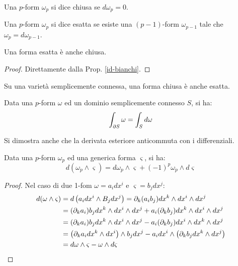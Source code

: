 \begin{definition}
	Una $ p $-form $ \omega_p $ si dice chiusa se $ d\omega_p = 0 $.
\end{definition}

\begin{definition}
	Una $ p $-form $ \omega_p $ si dice esatta se esiste una $ (p-1) $-form $ \omega_{p-1} $ tale che $ \omega_p = d\omega_{p-1} $.
\end{definition}

\begin{proposition}
	Una forma esatta è anche chiusa.
\end{proposition}
\begin{proof}
	Direttamente dalla Prop. \ref{id-bianchi}.
\end{proof}

\begin{lemma}[di Poincaré]
	Su una varietà semplicemente connessa, una forma chiusa è anche esatta.
\end{lemma}

\begin{theorem}[di Stokes]\label{th-stokes}
	Data una $ p $-form $ \omega $ ed un dominio semplicemente connesso $ S $, si ha:
	\begin{equation}
		\int_{\partial S} \omega = \int_S d\omega
		\label{eq:3.11}
	\end{equation}
\end{theorem}

Si dimostra anche che la derivata esteriore anticommuta con i differenziali.

\begin{proposition}
	Data una $ p $-form $ \omega_p $ ed una generica forma $ \varsigma $, si ha:
	\begin{equation}
		d(\omega_p \wedge \varsigma) = d\omega_p \wedge \varsigma + (-1)^p \omega_p \wedge d\varsigma
		\label{eq:3.12}
	\end{equation}
\end{proposition}
\begin{proof}
	Nel caso di due 1-fom $ \omega = a_i dx^i $ e $ \varsigma = b_j dx^j $:
	\begin{equation*}
		\begin{split}
			d(\omega \wedge \varsigma) &= d\left( a_i  dx^i \wedge B_j dx^j \right) = \partial_k (a_i b_j) dx^k \wedge dx^i \wedge dx^j\\
						   &= (\partial_k a_i) b_j dx^k \wedge dx^i \wedge dx^j + a_i (\partial_k b_j) dx^k \wedge dx^i \wedge dx^j\\
						   &= (\partial_k a_i) b_j dx^k \wedge dx^i \wedge dx^j - a_i (\partial_k b_j) dx^i \wedge dx^k \wedge dx^j\\
						   &= \left( \partial_k a_i dx^k \wedge dx^i \right) \wedge b_j dx^j - a_i dx^i \wedge \left( \partial_k b_j dx^k \wedge dx^j \right)\\
						   &= d\omega \wedge \varsigma - \omega \wedge d\varsigma
		\end{split}
	\end{equation*}
\end{proof}

